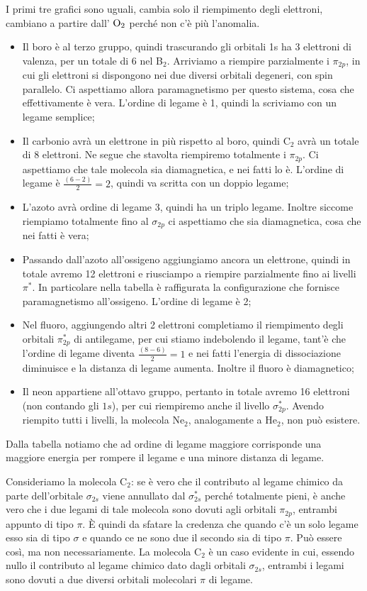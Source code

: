 I primi tre grafici sono uguali, cambia solo il riempimento degli elettroni, cambiano a partire dall' $\rm O_2$ perché non c'è più l'anomalia.
\begin{itemize}
    \item Il boro è al terzo gruppo, quindi trascurando gli orbitali 1s ha 3 elettroni di valenza, per un totale di 6 nel B$_2$.
    Arriviamo a riempire parzialmente i $\pi_{2p}$, in cui gli elettroni si dispongono nei due diversi orbitali degeneri, con spin parallelo. Ci aspettiamo allora paramagnetismo per questo sistema, cosa che effettivamente è vera. L'ordine di legame è 1, quindi la scriviamo con un legame semplice;
    \item Il carbonio avrà un elettrone in più rispetto al boro, quindi C$_2$ avrà un totale di 8 elettroni. Ne segue che stavolta riempiremo totalmente i $\pi_{2p}$. Ci aspettiamo che tale molecola sia diamagnetica, e nei fatti lo è. L'ordine di legame è $\frac{(6-2)}{2}=2$, quindi va scritta con un doppio legame;
    \item L'azoto avrà ordine di legame 3, quindi ha un triplo legame. Inoltre siccome riempiamo totalmente fino al $\sigma_{2p}$ ci aspettiamo che sia diamagnetica, cosa che nei fatti è vera;
    \item Passando dall'azoto all'ossigeno aggiungiamo ancora un elettrone, quindi in totale avremo 12 elettroni e riusciampo a riempire parzialmente fino ai livelli $\pi^*$. In particolare nella tabella è raffigurata la configurazione che fornisce paramagnetismo all'ossigeno. L'ordine di legame è 2;
    \item Nel fluoro, aggiungendo altri 2 elettroni completiamo il riempimento degli orbitali $\pi_{2p}^*$ di antilegame, per cui stiamo indebolendo il legame, tant'è che l'ordine di legame diventa $\frac{(8-6)}{2}=1$ e nei fatti l'energia di dissociazione diminuisce e la distanza di legame aumenta. Inoltre il fluoro è diamagnetico;
    \item Il neon appartiene all'ottavo gruppo, pertanto in totale avremo 16 elettroni (non contando gli $1s$), per cui riempiremo anche il livello $\sigma_{2p}^*$. Avendo riempito tutti i livelli, la molecola Ne$_2$, analogamente a He$_2$, non può esistere.
\end{itemize}
Dalla tabella notiamo che ad ordine di legame maggiore corrisponde una maggiore energia per rompere il legame e una minore distanza di legame.

\vspace{0.2cm}Consideriamo la molecola C$_2$: se è vero che il contributo al legame chimico da parte dell'orbitale $\sigma_{2s}$ viene annullato dal $\sigma_{2s}^*$ perché totalmente pieni, è anche vero che i due legami di tale molecola sono dovuti agli orbitali $\pi_{2p}$, entrambi appunto di tipo $\pi$. È quindi da sfatare la credenza che quando c'è un solo legame esso sia di tipo $\sigma$ e quando ce ne sono due il secondo sia di tipo $\pi$. Può essere così, ma non necessariamente. La molecola C$_2$ è un caso evidente in cui, essendo nullo il contributo al legame chimico dato dagli orbitali $\sigma_{2s}$, entrambi i legami sono dovuti a due diversi orbitali molecolari $\pi$ di legame.

